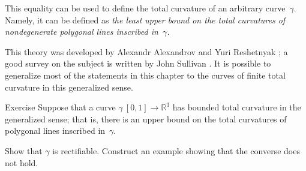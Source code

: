 This equality can be used to define the total curvature of an arbitrary curve~$\gamma$.
Namely, it can be defined as {}\textit{the least upper bound on the total curvatures of nondegenerate polygonal lines inscribed in~$\gamma$.}

This theory was developed by Alexandr Alexandrov and Yuri Reshetnyak \cite{aleksandrov-reshetnyak};
a good survey on the subject is written by John Sullivan \cite{sullivan-curves}.
It is possible to generalize most of the statements in this chapter to the curves of finite total curvature in this generalized sense.


\begin{thm}{Exercise}\label{ex:tc-rectifiable}
Suppose that a curve $\gamma\:[0,1]\to\mathbb{R}^3$ has bounded total curvature in the generalized sense;
that is, there is an upper bound on the total curvatures of polygonal lines inscribed in~$\gamma$.

Show that $\gamma$ is rectifiable.
Construct an example showing that the converse does not hold. 
\end{thm}

